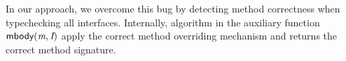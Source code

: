 
In our approach, we overcome this bug by detecting method correctness when
typechecking all interfaces. Internally, algorithm in the auxiliary function
$\textsf{mbody}(\textit{m},\textit{I})$ apply the correct method overriding mechanism and returns the
correct method signature.
